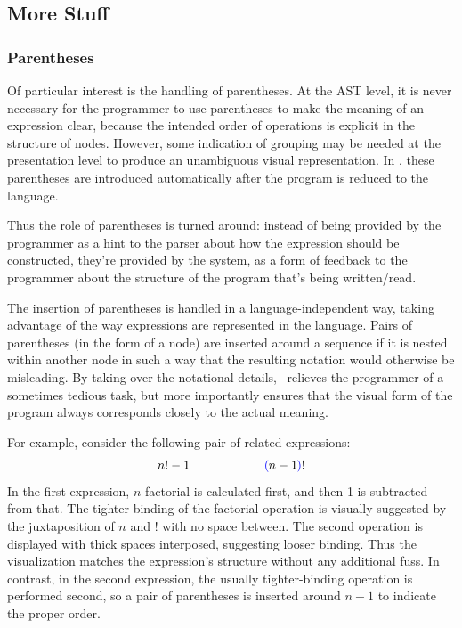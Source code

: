 \subsection{More Stuff}

\subsubsection{Parentheses}
Of particular interest is the handling of parentheses. At the AST level, it is never necessary for the programmer to use parentheses to make the meaning of an expression clear, because the intended order of operations is explicit in the structure of nodes. However, some indication of grouping may be needed at the presentation level to produce an unambiguous visual representation. In \Meta, these parentheses are introduced automatically after the program is reduced to the  language. 

Thus the role of parentheses is turned around: instead of being provided by the programmer as a hint to the parser about how the expression should be constructed, they're provided by the system, as a form of feedback to the programmer about the structure of the program that's being written/read. 

The insertion of parentheses is handled in a language-independent way, taking advantage of the way expressions are represented in the  language. Pairs of parentheses (in the form of a  node) are inserted around a sequence if it is nested within another node in such a way that the resulting notation would otherwise be misleading. By taking over the notational details, \Meta\ relieves the programmer of a sometimes tedious task, but more importantly ensures that the visual form of the program always corresponds closely to the actual meaning.

For example, consider the following pair of related expressions:
$$n! - 1 \qquad \qquad \qquad {\color{blue}\left(\!\right.} n - 1 {\color{blue}\left.\!\right)} !$$
In the first expression, $n$ factorial is calculated first, and then 1 is subtracted from that. The tighter binding of the factorial operation is visually suggested by the juxtaposition of $n$ and $!$ with no space between. The second operation is displayed with thick spaces interposed, suggesting looser binding. Thus the visualization matches the expression's structure without any additional fuss. In contrast, in the second expression, the usually tighter-binding operation is performed second, so a pair of parentheses is inserted around $n-1$ to indicate the proper order. 

